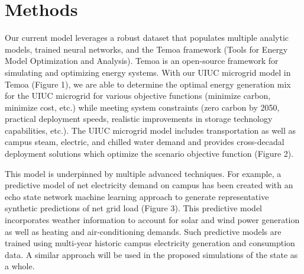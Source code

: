 \section{Methods}
Our current model leverages a robust dataset that populates multiple analytic 
models, trained neural networks, and  the Temoa framework (Tools for Energy 
Model Optimization and Analysis). Temoa is an open-source framework for 
simulating and optimizing energy systems. With our UIUC microgrid model in 
Temoa (Figure 1), we are able to determine the optimal energy generation mix 
for the UIUC microgrid for various objective functions (minimize carbon, 
minimize cost, etc.) while meeting system constraints (zero carbon by 2050, 
practical deployment speeds, realistic improvements in storage technology 
capabilities, etc.). The UIUC microgrid model includes transportation as well 
as campus steam, electric, and chilled water demand and provides cross-decadal 
deployment solutions which optimize the scenario objective function (Figure 2).

This model is underpinned by multiple advanced techniques. For example, a 
predictive model of net electricity demand on campus has been created with an 
echo state network machine learning approach to generate representative 
synthetic predictions of net grid load (Figure 3). This predictive model 
incorporates weather information to account for solar and wind power generation 
as well as heating and air-conditioning demands. Such predictive models are 
trained using multi-year historic campus electricity generation and consumption 
data. A similar approach will be used in the proposed simulations of the state 
as a whole.


